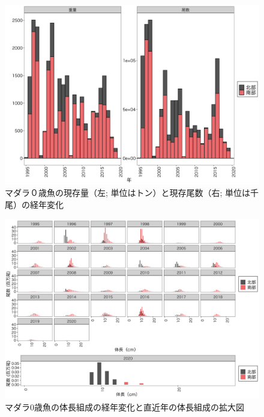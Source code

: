 \documentclass[11pt]{article} %
\begin{document}
\begin{linenumbers}
\begin{figure}[h]
  \centering
  \includegraphics[width = 14cm]{マダラ０＋trend.png}
  \caption{マダラ０歳魚の現存量（左; 単位はトン）と現存尾数（右; 単位は千尾）の経年変化}
\end{figure}

\begin{figure}[h]
  \centering
  \includegraphics[width = 14cm]{マダラ0+length.png}
  \caption{マダラ0歳魚の体長組成の経年変化と直近年の体長組成の拡大図}
\end{figure}


\end{linenumbers}
\end{document}
